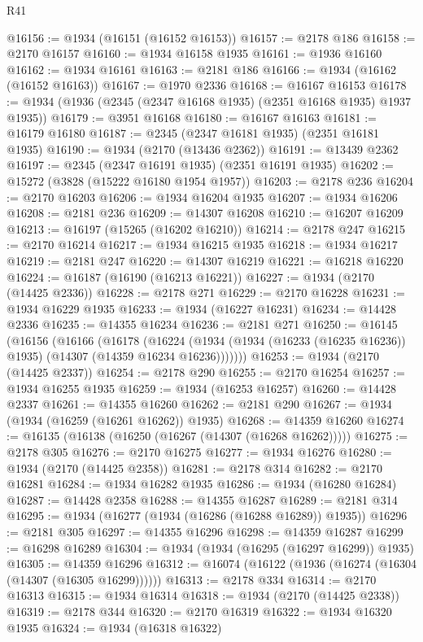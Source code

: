 \begin{lexlean}{R41}
\begin{coremodule}
@16156 := @1934 (@16151 (@16152 @16153))
@16157 := @2178 @186
@16158 := @2170 @16157
@16160 := @1934 @16158 @1935
@16161 := @1936 @16160
@16162 := @1934 @16161
@16163 := @2181 @186
@16166 := @1934 (@16162 (@16152 @16163))
@16167 := @1970 @2336
@16168 := @16167 @16153
@16178 := @1934 (@1936 (@2345 (@2347 @16168 @1935) (@2351 @16168 @1935) @1937 @1935))
@16179 := @3951 @16168
@16180 := @16167 @16163
@16181 := @16179 @16180
@16187 := @2345 (@2347 @16181 @1935) (@2351 @16181 @1935)
@16190 := @1934 (@2170 (@13436 @2362))
@16191 := @13439 @2362
@16197 := @2345 (@2347 @16191 @1935) (@2351 @16191 @1935)
@16202 := @15272 (@3828 (@15222 @16180 @1954 @1957))
@16203 := @2178 @236
@16204 := @2170 @16203
@16206 := @1934 @16204 @1935
@16207 := @1934 @16206
@16208 := @2181 @236
@16209 := @14307 @16208
@16210 := @16207 @16209
@16213 := @16197 (@15265 (@16202 @16210))
@16214 := @2178 @247
@16215 := @2170 @16214
@16217 := @1934 @16215 @1935
@16218 := @1934 @16217
@16219 := @2181 @247
@16220 := @14307 @16219
@16221 := @16218 @16220
@16224 := @16187 (@16190 (@16213 @16221))
@16227 := @1934 (@2170 (@14425 @2336))
@16228 := @2178 @271
@16229 := @2170 @16228
@16231 := @1934 @16229 @1935
@16233 := @1934 (@16227 @16231)
@16234 := @14428 @2336
@16235 := @14355 @16234
@16236 := @2181 @271
@16250 := @16145
    (@16156
      (@16166
        (@16178
          (@16224 (@1934 (@1934 (@16233 (@16235 @16236)) @1935) (@14307 (@14359 @16234 @16236)))))))
@16253 := @1934 (@2170 (@14425 @2337))
@16254 := @2178 @290
@16255 := @2170 @16254
@16257 := @1934 @16255 @1935
@16259 := @1934 (@16253 @16257)
@16260 := @14428 @2337
@16261 := @14355 @16260
@16262 := @2181 @290
@16267 := @1934 (@1934 (@16259 (@16261 @16262)) @1935)
@16268 := @14359 @16260
@16274 := @16135 (@16138 (@16250 (@16267 (@14307 (@16268 @16262)))))
@16275 := @2178 @305
@16276 := @2170 @16275
@16277 := @1934 @16276
@16280 := @1934 (@2170 (@14425 @2358))
@16281 := @2178 @314
@16282 := @2170 @16281
@16284 := @1934 @16282 @1935
@16286 := @1934 (@16280 @16284)
@16287 := @14428 @2358
@16288 := @14355 @16287
@16289 := @2181 @314
@16295 := @1934 (@16277 (@1934 (@16286 (@16288 @16289)) @1935))
@16296 := @2181 @305
@16297 := @14355 @16296
@16298 := @14359 @16287
@16299 := @16298 @16289
@16304 := @1934 (@1934 (@16295 (@16297 @16299)) @1935)
@16305 := @14359 @16296
@16312 := @16074 (@16122 (@1936 (@16274 (@16304 (@14307 (@16305 @16299))))))
@16313 := @2178 @334
@16314 := @2170 @16313
@16315 := @1934 @16314
@16318 := @1934 (@2170 (@14425 @2338))
@16319 := @2178 @344
@16320 := @2170 @16319
@16322 := @1934 @16320 @1935
@16324 := @1934 (@16318 @16322)

\end{coremodule}
\end{lexlean}
